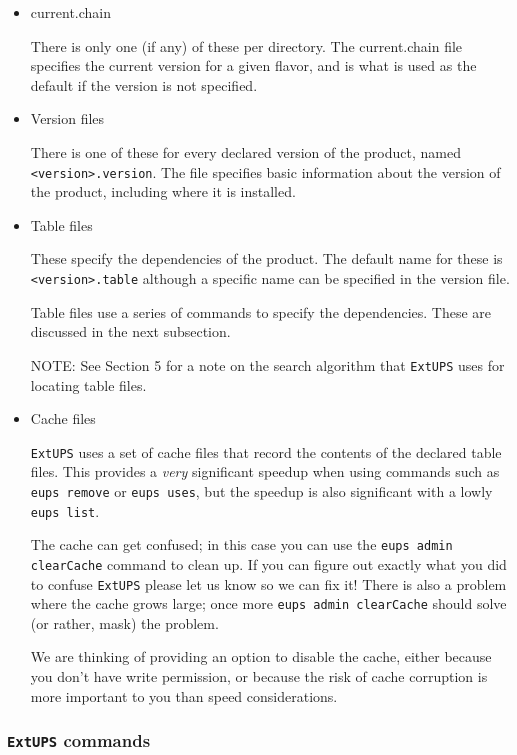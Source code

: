 \documentclass{article}
\newcommand{\code}[1]{\texttt{#1}}
\newcommand{\file}[1]{\texttt{#1}}
\newcommand{\eups}{\code{ExtUPS}}
\begin{document}
\begin{itemize}
  \item current.chain

    There is only one (if any) of these per directory.  The
    current.chain file specifies the current version for a given
    flavor, and is what is used as the default if the version is not
    specified.

  \item Version files

    There is one of these for every declared version of the product,
    named \file{<version>.version}. The file specifies basic information
    about the version of the product, including where it is installed.

  \item Table files

    These specify the dependencies of the product. The default name
    for these is \file{<version>.table} although a specific name can be specified in the
    version file.

    Table files use a series of commands to specify the dependencies. These are
    discussed in the next subsection.

    NOTE: See Section 5 for a note on the search algorithm that \eups{} uses for 
    locating table files.

  \item Cache files

    \eups{} uses a set of cache files that record the contents of the declared
    table files.  This provides a \emph{very} significant speedup when using
    commands such as \code{eups remove} or \code{eups uses}, but the speedup
    is also significant with a lowly \code{eups list}.

    The cache can get confused; in this case you can use the \code{eups admin clearCache}
    command to clean up.  If you can figure out exactly what you did to confuse
    \eups{} please let us know so we can fix it!  There is also a problem where
    the cache grows large;  once more \code{eups admin clearCache} should
    solve (or rather, mask) the problem.

    We are thinking of providing an option to disable the cache, either because
    you don't have write permission, or because the risk of cache corruption is
    more important to you than speed considerations.
\end{itemize}

\subsubsection{\eups{} commands}
\end{document}
